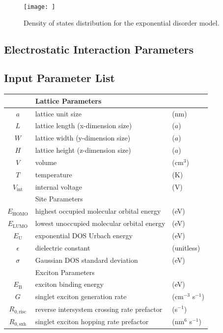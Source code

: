 \documentclass[%
 reprint,onecolumn,notitlepage,
superscriptaddress,longbibliography,
 amsmath,amssymb,
 aps,rmp,floatfix,
]{revtex4-1}
\begin{document}
\begin{figure}[h]
    \centering
    \texttt{[image: ]}
    \caption{Density of states distribution for the exponential disorder model.}
    \label{fig:exponential_dos}
\end{figure}

\subsection{Electrostatic Interaction Parameters}

\subsection{Input Parameter List}

\begin{center}
\begin{tabular}{ c l l }
 & Lattice Parameters & \\
\hline
$a$ & lattice unit size & (nm) \\
$L$ & lattice length (x-dimension size) & ($a$) \\
$W$ & lattice width (y-dimension size) & ($a$) \\
$H$ & lattice height (z-dimension size) & ($a$) \\
$V$ & volume & (cm$^3$) \\
$T$ & temperature & (K) \\
$V_\text{int}$ & internal voltage & (V) \\
\hline
& Site Parameters & \\
\hline
$E_\text{HOMO}$ & highest occupied molecular orbital energy & (eV) \\
$E_\text{LUMO}$ & lowest unoccupied molecular orbital energy & (eV) \\
$E_\text{U}$ & exponential DOS Urbach energy & (eV) \\
$\epsilon$ & dielectric constant & (unitless) \\
$\sigma$ & Gaussian DOS standard deviation & (eV) \\
\hline
 & Exciton Parameters & \\
 \hline
$E_\text{B}$ & exciton binding energy & (eV) \\
$G$ & singlet exciton generation rate & (cm$^{-3}$ s$^{-1}$) \\
$R_{0,\text{risc}}$ & reverse intersystem crossing rate prefactor & (s$^{-1}$) \\
$R_{0,\text{sxh}}$ & singlet exciton hopping rate prefactor & (nm$^6$ s$^{-1}$) \\

\end{tabular}
\end{center}
\end{document}
